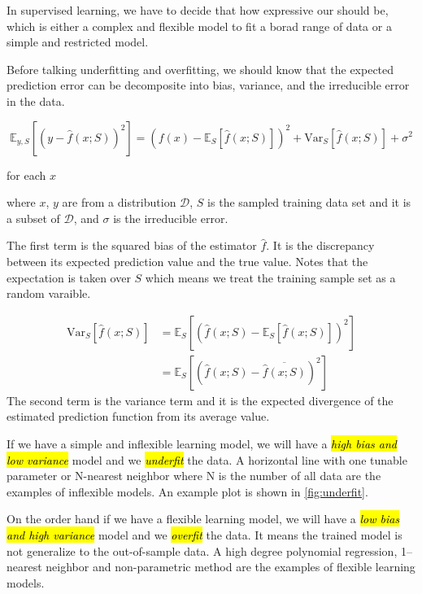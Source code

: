 \documentclass{kthreport}
\begin{document}
In supervised learning, we have to decide that how expressive our should be,
which is either a complex and flexible model to fit a borad range of data or
a simple and restricted model.

Before talking underfitting and overfitting, we should know that the expected prediction
error can be decomposite into bias, variance, and the irreducible error in the data.

\begin{equation}
    \mathbb{E}_{y,S}[(y-\hat{f}(x; S))^2] =
    (f(x) - \mathbb{E}_{S}[\hat{f}(x; S)])^2
    + \mathrm{Var}_{S}[\hat{f}(x; S)]
    + \sigma^2
\end{equation}

for each $x$

where $x$, $y$ are from a distribution $\mathcal{D}$, $S$ is the sampled training
data set and it is a subset of $\mathcal{D}$, and $\sigma$ is the irreducible error.

The first term is the squared bias of the estimator $\hat{f}$.
It is the discrepancy between its expected prediction value and the true value.
Notes that the expectation is taken over $S$ which means we treat the training sample
set as a random varaible.

\begin{align}
    \mathrm{Var}_{S}[\hat{f}(x; S)]
    &= \mathbb{E}_{S}[(\hat{f}(x; S) - \mathbb{E}_{S}[\hat{f}(x; S)])^2] \\
    &= \mathbb{E}_{S}[(\hat{f}(x; S) - \overline{\hat{f}(x; S)})^2]
\end{align}
The second term is the variance term and it is
the expected divergence of the estimated prediction function from its average value.


If we have a simple and inflexible learning model, we will have
a \emph{\hl{high bias and low variance}} model and we \emph{\hl{underfit}} the data.
A horizontal line with one tunable parameter or N-nearest neighbor
where N is the number of all data are the examples of inflexible models.
An example plot is shown in \cref{fig:underfit}.

On the order hand if we have a flexible learning model,
we will have a \emph{\hl{low bias and high variance}} model and we \emph{\hl{overfit}} the data.
It means the trained model is not generalize to the out-of-sample data. A high
degree polynomial regression, 1--nearest neighbor and non-parametric method are the
examples of flexible learning models.
\end{document}
